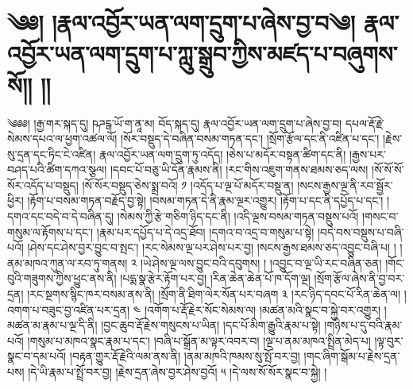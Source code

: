\chapter{༄༅། །རྣལ་འབྱོར་ཡན་ལག་དྲུག་པ་ཞེས་བྱ་བ༄། རྣལ་འབྱོར་ཡན་ལག་དྲུག་པ་ཀླུ་སྒྲུབ་ཀྱིས་མཛད་པ་བཞུགས་སོ།། །།}༄༅༅། །རྒྱ་གར་སྐད་དུ། ཥཌངྒ་ཡོ་ག་ནཱ་མ། བོད་སྐད་དུ། རྣལ་འབྱོར་ཡན་ལག་དྲུག་པ་ཞེས་བྱ་བ། དཔལ་རྡོ་རྗེ་སེམས་དཔའ་ལ་ཕྱག་འཚལ་ལོ། །སོར་བསྡུད་དེ་བཞིན་བསམ་གཏན་དང་། །སྲོག་རྩོལ་དང་ནི་འཛིན་པ་དང་། །རྗེས་སུ་དྲན་དང་ཏིང་ངེ་འཛིན། རྣལ་འབྱོར་ཡན་ལག་དྲུག་ཏུ་འདོད། །ཅེས་པ་མདོར་བསྟན་ཚིག་དང་ནི། །རྒྱས་པར་བཤད་པའི་ཚིག་དཀའ་སྩལ། །དབང་པོ་བཅུ་ཡི་དོན་རྣམས་ནི། །རང་གིས་འཇུག་གནས་ཐམས་ཅད་ལས། །སོ་སོ་སོ་སོར་འདོད་པ་བསྡུད། །སོ་སོར་བསྡུད་ཅེས་སྨྲ་བའོ། ༡ །འདོད་པ་ལྔ་པོ་མདོར་བསྡུ་ན། །སངས་རྒྱས་ལྔ་ནི་རབ་སྦྱོར་ཕྱིར། །རྟོག་པ་བསམ་གཏན་བརྗོད་བྱ་སྟེ། །བསམ་གཏན་དེ་ནི་རྣམ་ལྔར་འགྱུར། །རྟོག་པ་དང་ནི་དཔྱོད་པ་དང་། །དགའ་དང་བདེ་བ་དེ་བཞིན་དུ། །སེམས་ཀྱི་རྩེ་གཅིག་ཉིད་དང་ནི། །འདི་ལྔས་བསམ་གཏན་བསྡུས་པའོ། །གསང་བ་གསུམ་ལ་རྟོགས་པ་དང་། །རྣམ་པར་དཔྱོད་པ་དེ་འདྲ་ཐོབ། །དགའ་བ་འདྲ་བ་གསུམ་པ་སྟེ། །བདེ་བས་བསྡུས་པ་བཞི་པའོ། །ཤེས་དང་ཤེས་བྱར་བྱུང་བ་སྤང་། །རང་སེམས་ལྔ་པར་ཤེས་པར་བྱ། །སངས་རྒྱས་ཐམས་ཅད་འབྱུང་བཞི་པ། ། །ནམ་མཁའ་ཀུན་ལ་རབ་ཏུ་གནས། ༢ །ཡེ་ཤེས་ལྔ་ལས་བྱུང་བའི་དབུགས། ། །འབྱུང་བ་ལྔ་ཡི་རང་བཞིན་ཅན། །གོང་བུའི་གཟུགས་ཀྱིས་ཕྱུང་ནས་ནི། །པདྨ་སྣ་རྩེར་རྟོག་པར་བྱ། །རིན་ཆེན་ཆེན་པོ་ཁ་དོག་ལྔ། །སྲོག་རྩོལ་ཞེས་ནི་བྱ་བར་དྲན། །རང་སྔགས་སྙིང་ཁར་བསམ་ནས་ནི། །སྲོག་ནི་ཐིག་ལེར་སོན་པར་བཞག ༣ །རང་ཉིད་དབང་པོ་རིན་ཆེན་ལ། །འགག་པ་བཟུང་བྱ་འཛིན་པར་དྲན། ༤ །འགོག་པ་རྡོ་རྗེར་སོང་སེམས་ལ། །མཚན་མའི་སྣང་བ་སྐྱེ་བར་འགྱུར། །མཚན་མ་རྣམ་པ་ལྔ་དི་ནི། །བྱང་ཆུབ་རྡོ་རྗེས་གསུངས་པ་ཡིན། །དང་པོ་མིག་རྒྱུའི་རྣམ་པ་སྟེ། །གཉིས་པ་དུ་བའི་རྣམ་པའོ། །གསུམ་པ་མཁའ་སྣང་རྣམ་པ་དང་། །བཞི་པ་སྒྲོན་མ་ལྟར་འབར་བ། །ལྔ་པ་ནམ་མཁའ་སྤྲིན་མེད་པ། །ལྟ་བུར་སྣང་བ་དམ་པའོ། །བརྟན་གྱུར་རྡོ་རྗེའི་ལམ་ནས་ནི། །ནམ་མཁའི་ཁམས་སུ་སྤོ་བར་བྱ། །གང་ཞིག་སྒོམ་པ་རྗེས་དྲན་པས། །དེ་ཡི་རྣམ་པ་སྤྲོ་བར་བྱ། །རྗེས་དྲན་ཞེས་བྱར་ཤེས་བྱའོ། ༥ །དེ་ལས་སོ་སོར་སྣང་བ་སྐྱེ། །
